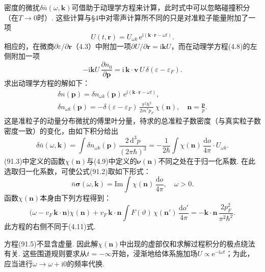 密度的微扰$\delta\bar{n}(\omega,\bm{k})$可借助于动理学方程来计算，此时式中可以忽略碰撞积分（在$T\to0$时）. 这些计算与§4中对零声计算所不同的只是对准粒子能量附加了一项
\begin{equation*}
U(t,\bm{r})=U_{\omega k}\,\mathrm{e}^{\mathrm{i}(\bm{k}\cdot\bm{r}-\omega t)}.
\end{equation*}
相应的，在微商$\partial\varepsilon/\partial\bm{r}$（4.3）中附加一项$\partial U/\partial\bm{r}=\mathrm{i}\bm{k}U$，而在动理学方程(4.8)的左侧附加一项
\begin{equation*}
-\mathrm{i}\bm{k}U\,\frac{\partial n_{0}}{\partial\bm{p}}=\mathrm{i}\,\bm{k}\cdot\bm{v}\,U\,\delta(\varepsilon-\varepsilon_{F}).
\end{equation*}
求出动理学方程的解如下：
\begin{equation}
\begin{gathered}
\delta n(\bm{p})=\delta n_{\omega k}(\bm{p})\,\mathrm{e}^{\mathrm{i}(\bm{k}\cdot\bm{r}-\omega t)},\\
\delta n_{\omega k}(\bm{p})=-\delta(\varepsilon-\varepsilon_{F})\,\frac{\pi^{2}\hbar^{2}}{2m^{*}p_{F}}\,\chi(\bm{n}),\quad\bm{n}=\frac{\bm{p}}{p}.
\end{gathered}
\end{equation}
这是准粒子的动量分布微扰的傅里叶分量，待求的总准粒子数密度（与真实粒子数密度一致）的变化，由如下积分给出
\begin{equation*}
\delta\bar{n}(\omega,\bm{k})=\int\delta n_{\omega k}(\bm{p})\,\frac{2\,\mathrm{d}^{3}p}{(2\pi\hbar)^{3}}=-\frac{1}{2\hbar}\int\chi(\bm{n})\,\frac{\mathrm{d}o}{4\pi}\cdot U_{\omega k}.
\end{equation*}
(91.3)中定义的函数$\chi(\bm{n})$与(4.9)中定义的$\bm{\nu}(\bm{n})$不同之处在于归一化系数. 在此选取归一化系数，可使公式(91.2)取如下形式：
\begin{equation}
\bar{n}\bm{\sigma}(\omega,\bm{k})=\mathrm{Im}\int\chi(\bm{n})\,\frac{\mathrm{d}o}{4\pi},\quad\omega>0.
\end{equation}
函数$\chi(\bm{n})$本身由下列方程得到：
\begin{equation}
\bigl(\omega-v_{F}\,\bm{k}\cdot\bm{n}\bigr)\chi(\bm{n})+v_{F}\,\bm{k}\cdot\bm{n}\int F(\vartheta)\,\chi(\bm{n}')\,\frac{\mathrm{d}o'}{4\pi}=-\bm{k}\cdot\bm{n}\,\frac{2p^{2}_{F}}{\pi^{2}\hbar^{2}}.
\end{equation}
此方程的右侧不同于(4.11)式.

方程(91.5)不显含虚量. 因此解$\chi(\bm{n})$中出现的虚部仅和求解过程积分的极点绕法有关. 这些围道规则要求从$t=-\infty$开始，浸渐地给体系施加场$U\propto\mathrm{e}^{-\mathrm{i}\omega t}$；为此，应当进行$\omega\to\omega+\mathrm{i}0$的频率代换.

